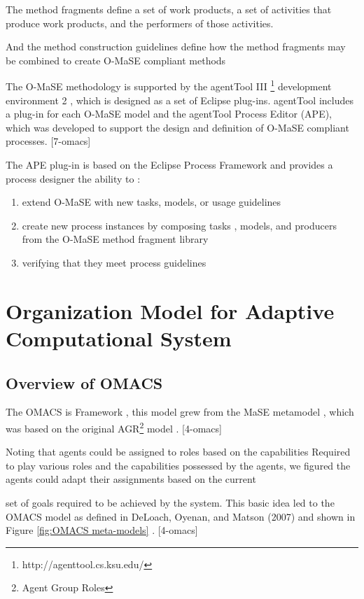 The method fragments define a set of work products, a set of activities that produce work products, and the performers of those activities.

And the method construction guidelines define how the method fragments may be
combined to create O-MaSE compliant methods

The O-MaSE methodology is supported by the agentTool III \footnote{http://agenttool.cs.ksu.edu/}
 development environment 2 , 
which is designed as a set of Eclipse plug-ins. agentTool includes a plug-in for each O-MaSE model 
and the agentTool Process Editor (APE), which was developed to support the design and definition 
of O-MaSE compliant processes. [7-omacs]

The APE plug-in is based on the Eclipse Process Framework and provides a process designer the ability to : 
\begin{enumerate}
\item 
	extend O-MaSE with new tasks, models, or usage guidelines
\item
	create new process instances by composing tasks
, models, and producers from the O-MaSE method fragment library  
\item
	 verifying that they meet process guidelines
\end{enumerate} 
 
\section{  Organization Model for Adaptive Computational System }
\subsection{ Overview of OMACS }
The OMACS is Framework , this model grew from the MaSE metamodel , 
which was based on the original AGR\footnote{Agent Group Roles}  model . [4-omacs]
 
Noting that agents could be assigned to roles based on the capabilities 
Required to play various roles and the capabilities possessed by the agents,
we figured the agents could adapt their assignments based on the current 


set of goals required to be achieved by the system.
This basic idea led to the OMACS  model as defined in DeLoach,
Oyenan, and Matson (2007) and shown in Figure \ref{fig:OMACS meta-models} . [4-omacs]

